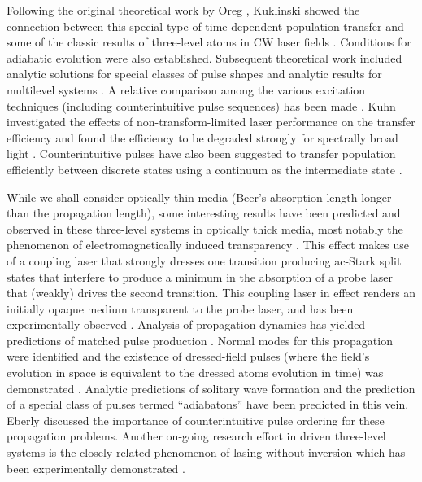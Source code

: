 Following the original theoretical work by Oreg \etal \cite{Oreg:84},
Kuklinski \etal \cite{Kuklinski:89} showed the connection between this special
type of time-dependent population transfer and some of the classic results of
three-level atoms in CW laser fields \cite{Arimondo:76,Gray:78}.  Conditions
for adiabatic evolution were also established.  Subsequent theoretical work
included analytic solutions for special classes of pulse shapes
\cite{Carroll:90} and analytic results for multilevel systems
\cite{Coulston:92}.  A relative comparison among the various excitation
techniques (including counterintuitive pulse sequences) has been made
\cite{He:90,Shore:92}.  Kuhn \etal investigated the effects of
non-transform-limited laser performance on the transfer efficiency and found
the efficiency to be degraded strongly for spectrally broad light
\cite{Kuhn:92}.  Counterintuitive pulses have also been suggested to
transfer population efficiently between discrete states using a continuum as
the intermediate state \cite{Carroll:92}.

While we shall consider optically thin media (Beer's absorption length longer
than the propagation length), some interesting results have been predicted and
observed in these three-level systems in optically thick media, most notably
the phenomenon of electromagnetically induced transparency \cite{Harris:89}. 
This effect makes use of a coupling laser that strongly dresses one
transition producing ac-Stark split states that interfere to produce a minimum
in the absorption of a probe laser that (weakly) drives the second transition. 
This coupling laser in effect renders an initially opaque medium transparent
to the probe laser, and has been experimentally observed \cite{Boller:91}. 
Analysis of propagation dynamics has yielded predictions of matched pulse
production \cite{Harris:93}.  Normal modes for this propagation were identified
\cite{Harris:94} and the existence of dressed-field pulses (where the field's
evolution in space is equivalent to the dressed atoms evolution in time) was
demonstrated \cite{Eberly:94}.  Analytic predictions of solitary wave formation
\cite{Hioe:94} and the prediction of a special class of pulses termed
``adiabatons'' \cite{Grobe:94} have been predicted in this vein.  Eberly
\cite{Eberly:95} discussed the importance of counterintuitive pulse ordering for
these propagation problems.  Another on-going research effort in driven
three-level systems is the closely related phenomenon of lasing without
inversion which has been experimentally demonstrated \cite{Zibrov:95}.

